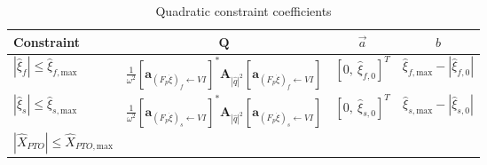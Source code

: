 \documentclass[a4paper,fleqn,colorlinks,unicode,lineno]{cas-dc} %
\makeatletter
\providecommand{\DIFaddtex}[1]{{\protect\color{blue}\uwave{#1}}} %
\providecommand{\DIFdeltex}[1]{{\protect\color{red}\sout{#1}}} %
\providecommand{\DIFaddFL}[1]{\DIFadd{#1}} %
\providecommand{\DIFdelFL}[1]{\DIFdel{#1}} %
\providecommand{\DIFaddbeginFL}{} %
\providecommand{\DIFaddendFL}{} %
\providecommand{\DIFdelbeginFL}{} %
\providecommand{\DIFdelendFL}{} %
\providecommand{\DIFadd}[1]{\texorpdfstring{\DIFaddtex{#1}}{#1}} %
\providecommand{\DIFdel}[1]{\texorpdfstring{\DIFdeltex{#1}}{}} %
\providecommand{\DIFscaledelfig}{0.5}
\newlength{\DIFdelgraphicswidth} %
\newlength{\DIFdelgraphicsheight} %
\providecommand{\DIFaddincludegraphics}[2][]{{\color{blue}\fbox{\DIFOincludegraphics[#1]{#2}}}} %
\providecommand{\DIFdelincludegraphics}[2][]{%
\sbox{\DIFdelgraphicsbox}{\DIFOincludegraphics[#1]{#2}}%
\settoboxwidth{\DIFdelgraphicswidth}{\DIFdelgraphicsbox} %
\settoboxtotalheight{\DIFdelgraphicsheight}{\DIFdelgraphicsbox} %
\scalebox{\DIFscaledelfig}{%
\parbox[b]{\DIFdelgraphicswidth}{\usebox{\DIFdelgraphicsbox}\\[-\baselineskip] \rule{\DIFdelgraphicswidth}{0em}}\llap{\resizebox{\DIFdelgraphicswidth}{\DIFdelgraphicsheight}{%
\setlength{\unitlength}{\DIFdelgraphicswidth}%
\begin{picture}(1,1)%
\thicklines\linethickness{2pt} %
{\color[rgb]{1,0,0}\put(0,0){\framebox(1,1){}}}%
{\color[rgb]{1,0,0}\put(0,0){\line( 1,1){1}}}%
{\color[rgb]{1,0,0}\put(0,1){\line(1,-1){1}}}%
\end{picture}%
}\hspace*{3pt}}} %
} %
\DeclareRobustCommand{\DIFaddbeginFL}{\DIFOaddbeginFL \let\includegraphics\DIFaddincludegraphics} %
\DeclareRobustCommand{\DIFaddendFL}{\DIFOaddendFL \let\includegraphics\DIFOincludegraphics} %
\DeclareRobustCommand{\DIFdelbeginFL}{\DIFOdelbeginFL \let\includegraphics\DIFdelincludegraphics} %
\DeclareRobustCommand{\DIFdelendFL}{\DIFOaddendFL \let\includegraphics\DIFOincludegraphics} %
\let\sout@orig\sout %
\renewcommand{\sout}[1]{\ifmmode\text{\sout@orig{\ensuremath{#1}}}\else\sout@orig{#1}\fi} %
\makeatother
\begin{document}
\begin{table}[b!]
\centering
\caption{Quadratic constraint coefficients}
\label{tab:qp-constraints}
\begin{tabular}{lccc}
    Constraint & \DIFdelbeginFL \DIFdelFL{$\mathbf{Q}$ }\DIFdelendFL \DIFaddbeginFL \DIFaddFL{$\gls{sym-mathbf-Q-mu}$ }\DIFaddendFL & \DIFdelbeginFL \DIFdelFL{$\vec{a}$ }\DIFdelendFL \DIFaddbeginFL \DIFaddFL{$\gls{sym-vec-a-mu}$ }\DIFaddendFL & \DIFdelbeginFL \DIFdelFL{$b$ }\DIFdelendFL \DIFaddbeginFL \DIFaddFL{$\gls{sym-b-mu}$ }\DIFaddendFL \\ \hline
    \DIFdelbeginFL \DIFdelFL{$|\hat{\xi}_f| \leq \hat{\xi}_{f,\text{max}}$ }\DIFdelendFL \DIFaddbeginFL \DIFaddFL{$|\gls{sym-hat-xi-f}| \leq \gls{sym-xi-f-max}$ }\DIFaddendFL &
        \DIFdelbeginFL \DIFdelFL{$\frac{1}{\omega^2}
        [\mathbf{a}_{(F_{p}\dot{\xi})_f\leftarrow VI}]^* 
        \mathbf{A}_{|\hat{q}|^2}
        [\mathbf{a}_{(F_{p}\dot{\xi})_f\leftarrow VI}]$ }\DIFdelendFL \DIFaddbeginFL \DIFaddFL{$\frac{1}{\gls{sym-omega}^2}
        [\gls{sym-mathbf-a-F-p-dot-xi-f-leftarrow-VI}]^*
        \gls{sym-mathbf-Q-hat-q-2}
        [\gls{sym-mathbf-a-F-p-dot-xi-f-leftarrow-VI}]$ }\DIFaddendFL &
        \DIFdelbeginFL \DIFdelFL{$[0,~ \hat{\xi}_{f,0}]^T$ }\DIFdelendFL \DIFaddbeginFL \DIFaddFL{$[0,~ \gls{sym-hat-xi-f-0}]^\top$ }\DIFaddendFL & \DIFdelbeginFL \DIFdelFL{$\hat{\xi}_{f,\text{max}} - |\hat{\xi}_{f,0}|$ }\DIFdelendFL \DIFaddbeginFL \DIFaddFL{$\gls{sym-xi-f-max} - |\gls{sym-hat-xi-f-0}|$ }\DIFaddendFL \\
    \DIFdelbeginFL \DIFdelFL{$|\hat{\xi}_s| \leq \hat{\xi}_{s,\text{max}}$ }\DIFdelendFL \DIFaddbeginFL \DIFaddFL{$|\gls{sym-hat-xi-s}| \leq \gls{sym-xi-s-max}$ }\DIFaddendFL &
        \DIFdelbeginFL \DIFdelFL{$\frac{1}{\omega^2}
        [\mathbf{a}_{(F_{p}\dot{\xi})_s\leftarrow VI}]^* 
        \mathbf{A}_{|\hat{q}|^2}
        [\mathbf{a}_{(F_{p}\dot{\xi})_s\leftarrow VI}]$ }\DIFdelendFL \DIFaddbeginFL \DIFaddFL{$\frac{1}{\gls{sym-omega}^2}
        [\gls{sym-mathbf-a-F-p-dot-xi-s-leftarrow-VI}]^*
        \gls{sym-mathbf-Q-hat-q-2}
        [\gls{sym-mathbf-a-F-p-dot-xi-s-leftarrow-VI}]$ }\DIFaddendFL &
        \DIFdelbeginFL \DIFdelFL{$[0,~ \hat{\xi}_{s,0}]^T$ }\DIFdelendFL \DIFaddbeginFL \DIFaddFL{$[0,~ \gls{sym-hat-xi-s-0}]^\top$ }\DIFaddendFL & \DIFdelbeginFL \DIFdelFL{$\hat{\xi}_{s,\text{max}} - |\hat{\xi}_{s,0}|$ }\DIFdelendFL \DIFaddbeginFL \DIFaddFL{$\gls{sym-xi-s-max} - |\gls{sym-hat-xi-s-0}|$ }\DIFaddendFL \\
    \DIFdelbeginFL \DIFdelFL{$|\hat{X}_{PTO}| \leq \hat{X}_{PTO,\text{max}}$ }\DIFdelendFL \DIFaddbeginFL \DIFaddFL{$|\gls{sym-hat-X-PTO}| \leq \gls{sym-X-PTO-max}$ }\DIFaddendFL &

\end{tabular}
\end{table}
\end{document}
